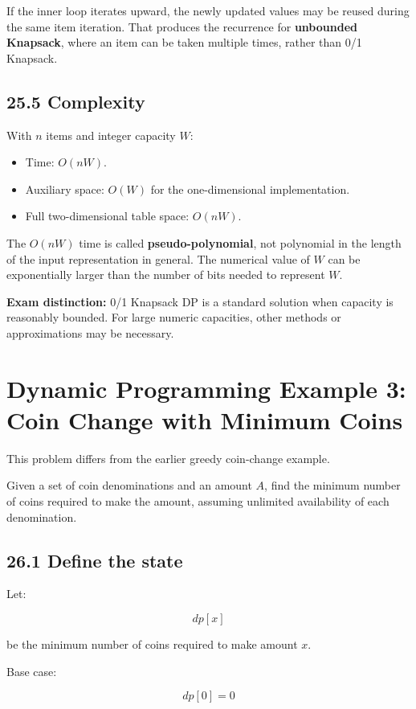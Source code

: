 If the inner loop iterates upward, the newly updated values may be reused during the same item iteration. That produces the recurrence for \textbf{unbounded Knapsack}, where an item can be taken multiple times, rather than 0/1 Knapsack.

\subsection{25.5 Complexity}

With $n$ items and integer capacity $W$:

\begin{itemize}
    \item Time: $O(nW)$.
    \item Auxiliary space: $O(W)$ for the one-dimensional implementation.
    \item Full two-dimensional table space: $O(nW)$.
\end{itemize}

The $O(nW)$ time is called \textbf{pseudo-polynomial}, not polynomial in the length of the input representation in general. The numerical value of $W$ can be exponentially larger than the number of bits needed to represent $W$.

\textbf{Exam distinction:} 0/1 Knapsack DP is a standard solution when capacity is reasonably bounded. For large numeric capacities, other methods or approximations may be necessary.

\section{Dynamic Programming Example 3: Coin Change with Minimum Coins}

This problem differs from the earlier greedy coin-change example.

Given a set of coin denominations and an amount $A$, find the minimum number of coins required to make the amount, assuming unlimited availability of each denomination.

\subsection{26.1 Define the state}

Let:


\[
dp[x]
\]


be the minimum number of coins required to make amount $x$.

Base case:


\[
dp[0]=0
\]


